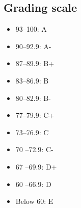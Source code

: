 \documentclass[12pt]{article}
\begin{document}
%
%
%
%
%
%
%
%
%

\subsection*{Grading scale}
\begin{itemize}
    \item 93–100: A
    \item 90–92.9: A-
    \item 87–89.9: B+
    \item 83–86.9: B
    \item 80–82.9: B-
    \item 77–79.9: C+
    \item 73–76.9: C
    \item 70 –72.9: C-
    \item 67 –69.9: D+
    \item 60 –66.9: D
    \item Below 60: E
\end{itemize}








\printbibliography
\end{document}
